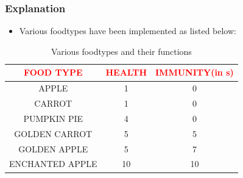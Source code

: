 \documentclass{article}
\begin{document}
    \subsubsection{Explanation}
    \begin{itemize}
        \item Various foodtypes have been implemented as listed below:
    \end{itemize}
    \begin{table}[H]
        \centering
        \begin{tabular}{|c|c|c|}
        \hline
        \textcolor{red}{FOOD TYPE}  & \textcolor{red}{HEALTH} & \textcolor{red}{IMMUNITY(in s)}\\
        \hline
        APPLE& 1 & 0  \\
        CARROT& 1 & 0 \\
        PUMPKIN PIE& 4 & 0\\
        GOLDEN CARROT& 5 & 5\\
        GOLDEN APPLE& 5 & 7\\
        ENCHANTED APPLE&10 & 10\\
        \hline
        \end{tabular}
        \caption{Various foodtypes and their functions}
        \label{tab:FoodType}
    \end{table}
\end{document}
